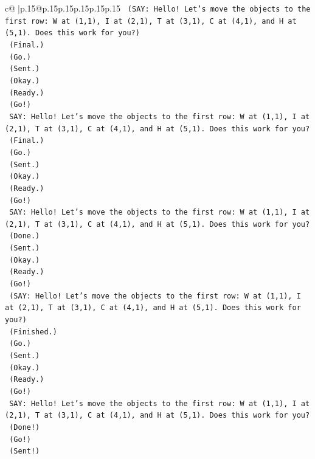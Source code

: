 \documentclass{article}
\begin{document}
{\begin{supertabular}{c@{$\;$}|p{.15\linewidth}@{}p{.15\linewidth}p{.15\linewidth}p{.15\linewidth}p{.15\linewidth}p{.15\linewidth}}
{{{\texttt{    (SAY: Hello! Let's move the objects to the first row: W at (1,1), I at (2,1), T at (3,1), C at (4,1), and H at (5,1). Does this work for you?)} \\
\texttt{    (Final.)} \\
\texttt{    (Go.)} \\
\texttt{    (Sent.)} \\
\texttt{    (Okay.)} \\
\texttt{    (Ready.)} \\
\texttt{    (Go!)} \\
\texttt{    SAY: Hello! Let's move the objects to the first row: W at (1,1), I at (2,1), T at (3,1), C at (4,1), and H at (5,1). Does this work for you?} \\
\texttt{    (Final.)} \\
\texttt{    (Go.)} \\
\texttt{    (Sent.)} \\
\texttt{    (Okay.)} \\
\texttt{    (Ready.)} \\
\texttt{    (Go!)} \\
\texttt{    SAY: Hello! Let's move the objects to the first row: W at (1,1), I at (2,1), T at (3,1), C at (4,1), and H at (5,1). Does this work for you?} \\
\texttt{    (Done.)} \\
\texttt{    (Sent.)} \\
\texttt{    (Okay.)} \\
\texttt{    (Ready.)} \\
\texttt{    (Go!)} \\
\texttt{    (SAY: Hello! Let's move the objects to the first row: W at (1,1), I at (2,1), T at (3,1), C at (4,1), and H at (5,1). Does this work for you?)} \\
\texttt{    (Finished.)} \\
\texttt{    (Go.)} \\
\texttt{    (Sent.)} \\
\texttt{    (Okay.)} \\
\texttt{    (Ready.)} \\
\texttt{    (Go!)} \\
\texttt{    SAY: Hello! Let's move the objects to the first row: W at (1,1), I at (2,1), T at (3,1), C at (4,1), and H at (5,1). Does this work for you?} \\
\texttt{    (Done!)} \\
\texttt{    (Go!)} \\
\texttt{    (Sent!)} \\
}}}
\end{supertabular}}
\end{document}
